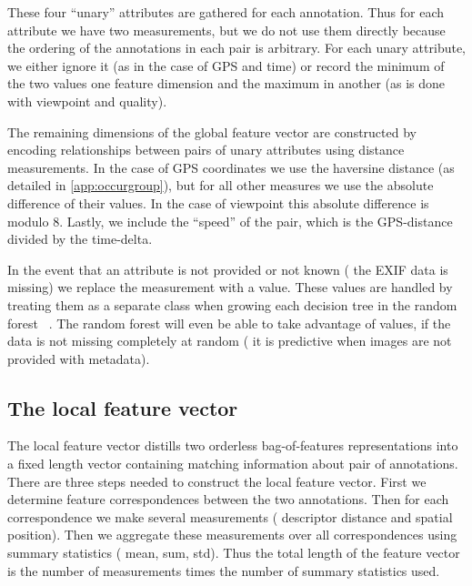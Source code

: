 These four ``unary'' attributes are gathered for each annotation.
Thus for each attribute we have two measurements, but we do not use them directly because the ordering of the
  annotations in each pair is arbitrary.
For each unary attribute, we either ignore it (as in the case of GPS and time) or record the minimum of the two
  values one feature dimension and the maximum in another (as is done with viewpoint and quality).

The remaining dimensions of the global feature vector are constructed by encoding relationships between pairs of
  unary attributes using distance measurements.
In the case of GPS coordinates we use the haversine distance (as detailed in \cref{app:occurgroup}), but for all
  other measures we use the absolute difference of their values.
In the case of viewpoint this absolute difference is modulo $8$.
Lastly, we include the ``speed'' of the pair, which is the GPS-distance divided by the time-delta.

In the event that an attribute is not provided or not known (\eg{} the EXIF data is missing) we replace the
  measurement with a \nan{} value.
These \nan{} values are handled by treating them as a separate class when growing each decision tree in the
  random forest ~\cite{ding_investigation_2010}.
The random forest will even be able to take advantage of \nan{} values, if the data is not missing completely at
  random (\ie{} it is predictive when images are not provided with metadata).


\subsection{The local feature vector}
The local feature vector distills two orderless bag-of-features representations into a fixed length vector
  containing matching information about pair of annotations.
There are three steps needed to construct the local feature vector.
First we determine feature correspondences between the two annotations.
Then for each correspondence we make several measurements (\eg{} descriptor distance and spatial position).
Then we aggregate these measurements over all correspondences using summary statistics (\eg{} mean, sum, std).
Thus the total length of the feature vector is the number of measurements times the number of summary statistics
  used.

